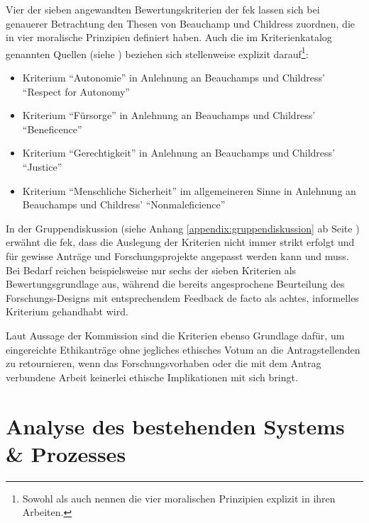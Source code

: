 \documentclass[a4paper,12pt,twoside]{scrreprt}
\begin{document}
Vier der sieben angewandten Bewertungskriterien der \ac{fek} lassen sich bei genauerer Betrachtung den Thesen von Beauchamp und Childress zuordnen, die in \cite{beauchamp_principles_1994} vier moralische Prinzipien definiert haben. Auch die im Kriterienkatalog genannten Quellen (siehe \cite[2]{forschungsethik-kommission_der_fachhochschule_vorarlberg_kriterienkatalog_2021}) beziehen sich stellenweise explizit darauf\footnote{Sowohl \cite{marckmann_was_2000} als auch \cite{schuchter_care_2018} nennen die vier moralischen Prinzipien explizit in ihren Arbeiten.}:
\begin{itemize}
    \item Kriterium \enquote{Autonomie} in Anlehnung an Beauchamps und Childress' \enquote{Respect for Autonomy} \cite[101-149]{beauchamp_principles_1994}
    \item Kriterium \enquote{Fürsorge} in Anlehnung an Beauchamps und Childress' \enquote{Beneficence} \cite[202-248]{beauchamp_principles_1994}
    \item Kriterium \enquote{Gerechtigkeit} in Anlehnung an Beauchamps und Childress' \enquote{Justice} \cite[249-301]{beauchamp_principles_1994}
    \item Kriterium \enquote{Menschliche Sicherheit} im allgemeineren Sinne in Anlehnung an Beauchamps und Childress' \enquote{Nonmaleficience} \cite[150-201]{beauchamp_principles_1994}
\end{itemize}

In der Gruppendiskussion (siehe Anhang \ref{appendix:gruppendiskussion} ab Seite \pageref{appendix:gruppendiskussion}) erwähnt die \acl{fek}, dass die Auslegung der Kriterien nicht immer strikt erfolgt und für gewisse Anträge und Forschungsprojekte angepasst werden kann und muss. Bei Bedarf reichen beispielsweise nur sechs der sieben Kriterien als Bewertungsgrundlage aus, während die bereits angesprochene Beurteilung des Forschungs-Designs mit entsprechendem Feedback de facto als achtes, informelles Kriterium gehandhabt wird.

Laut Aussage der Kommission sind die Kriterien ebenso Grundlage dafür, um eingereichte Ethikanträge ohne jegliches ethisches Votum an die Antragstellenden zu retournieren, wenn das Forschungsvorhaben oder die mit dem Antrag verbundene Arbeit keinerlei ethische Implikationen mit sich bringt.

\cleardoublepage
\chapter{Analyse des bestehenden Systems \& Prozesses}
\label{chap:analyse-bestehendes-system-prozess}
\end{document}
